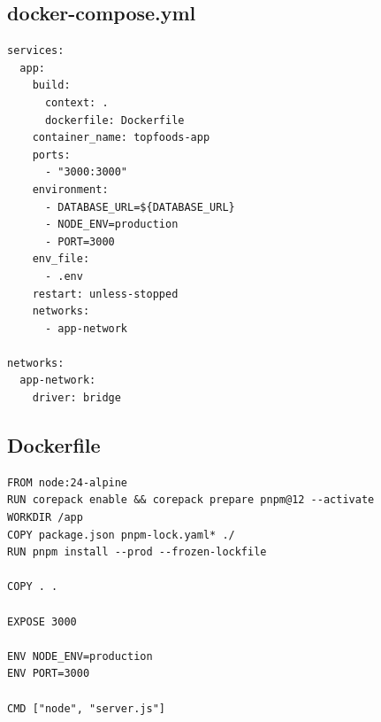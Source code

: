 \documentclass[11pt,a4paper]{article}
\begin{document}
\subsection*{docker-compose.yml}
\begin{lstlisting}[language=docker]
services:
  app:
    build:
      context: .
      dockerfile: Dockerfile
    container_name: topfoods-app
    ports:
      - "3000:3000"
    environment:
      - DATABASE_URL=${DATABASE_URL}
      - NODE_ENV=production
      - PORT=3000
    env_file:
      - .env
    restart: unless-stopped
    networks:
      - app-network

networks:
  app-network:
    driver: bridge
\end{lstlisting}
\subsection*{Dockerfile}
\begin{lstlisting}
FROM node:24-alpine
RUN corepack enable && corepack prepare pnpm@12 --activate
WORKDIR /app
COPY package.json pnpm-lock.yaml* ./
RUN pnpm install --prod --frozen-lockfile

COPY . .

EXPOSE 3000

ENV NODE_ENV=production
ENV PORT=3000

CMD ["node", "server.js"]
\end{lstlisting}
\end{document}
